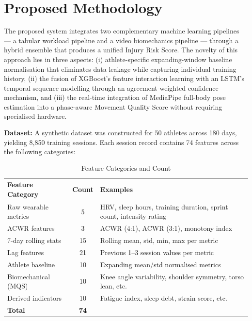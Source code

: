 \documentclass[12pt,a4paper]{report}
\begin{document}
\section{Proposed Methodology}

The proposed system integrates two complementary machine learning pipelines — a tabular workload pipeline and a video biomechanics pipeline — through a hybrid ensemble that produces a unified Injury Risk Score. The novelty of this approach lies in three aspects: (i) athlete-specific expanding-window baseline normalisation that eliminates data leakage while capturing individual training history, (ii) the fusion of XGBoost's feature interaction learning with an LSTM's temporal sequence modelling through an agreement-weighted confidence mechanism, and (iii) the real-time integration of MediaPipe full-body pose estimation into a phase-aware Movement Quality Score without requiring specialised hardware.

\par
\textbf{Dataset:} A synthetic dataset was constructed for 50 athletes across 180 days, yielding 8,850 training sessions. Each session record contains 74 features across the following categories:

\begin{table}[h!]
  \centering
  \caption{Feature Categories and Count}
  \label{tab:features}
  \vspace*{5pt}
  \begin{tabular}{|l|c|l|}
    \hline
    \textbf{Feature Category} & \textbf{Count} & \textbf{Examples} \\ \hline
    Raw wearable metrics   & 5  & HRV, sleep hours, training duration, sprint count, intensity rating \\ \hline
    ACWR features          & 3  & ACWR (4:1), ACWR (3:1), monotony index \\ \hline
    7-day rolling stats    & 15 & Rolling mean, std, min, max per metric \\ \hline
    Lag features           & 21 & Previous 1--3 session values per metric \\ \hline
    Athlete baseline       & 10 & Expanding mean/std normalised metrics \\ \hline
    Biomechanical (MQS)    & 10 & Knee angle variability, shoulder symmetry, torso lean, etc. \\ \hline
    Derived indicators     & 10 & Fatigue index, sleep debt, strain score, etc. \\ \hline
    \textbf{Total}         & \textbf{74} & \\ \hline
  \end{tabular}
\end{table}
\end{document}
